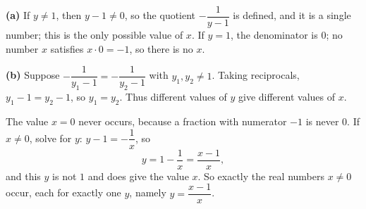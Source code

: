 \textbf{(a)} If $y\ne1$, then $y-1\ne0$, so the quotient $-\dfrac{1}{y-1}$ is defined, and it is a single number; this is the only possible value of $x$. If $y=1$, the denominator is $0$; no number $x$ satisfies $x\cdot0=-1$, so there is no $x$.

\textbf{(b)} Suppose $-\dfrac{1}{y_1-1}=-\dfrac{1}{y_2-1}$ with $y_1,y_2\ne1$. Taking reciprocals, $y_1-1=y_2-1$, so $y_1=y_2$. Thus different values of $y$ give different values of $x$.

The value $x=0$ never occurs, because a fraction with numerator $-1$ is never $0$. If $x\ne0$, solve for $y$: $y-1=-\dfrac{1}{x}$, so
\[y=1-\dfrac{1}{x}=\dfrac{x-1}{x},\]
and this $y$ is not $1$ and does give the value $x$. So exactly the real numbers $\boxed{x\ne0}$ occur, each for exactly one $y$, namely $y=\dfrac{x-1}{x}$.
